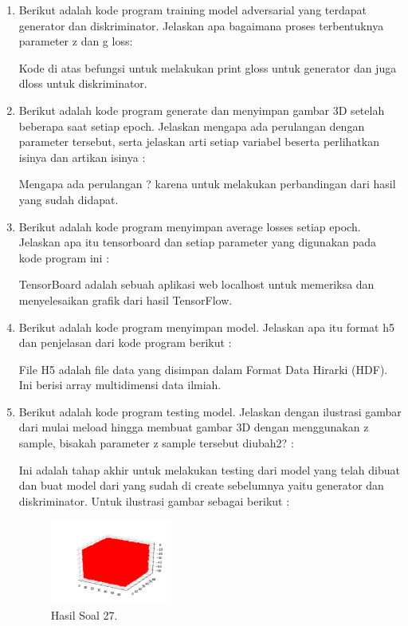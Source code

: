 \begin{enumerate}
    \item Berikut adalah kode program training model adversarial yang terdapat generator dan diskriminator. Jelaskan apa bagaimana proses terbentuknya parameter z dan g loss:
    
    \hfill\break
    Kode di atas befungsi untuk melakukan print gloss untuk generator dan juga dloss untuk diskriminator.

    \item  Berikut adalah kode program generate dan menyimpan gambar 3D setelah beberapa saat setiap epoch. Jelaskan mengapa ada perulangan dengan parameter tersebut, serta jelaskan arti setiap variabel beserta perlihatkan isinya dan artikan isinya :
    
    \hfill\break
    Mengapa ada perulangan ? karena untuk melakukan perbandingan dari hasil yang sudah didapat.

    \item Berikut adalah kode program menyimpan average losses setiap epoch. Jelaskan apa itu tensorboard dan setiap parameter yang digunakan pada kode program ini :
    
    \hfill\break
    TensorBoard adalah sebuah aplikasi web localhost untuk memeriksa dan menyelesaikan grafik dari hasil TensorFlow.
    
    \item Berikut adalah kode program menyimpan model. Jelaskan apa itu format h5 dan penjelasan dari kode program berikut :
    
    \hfill\break
    File H5 adalah file data yang disimpan dalam Format Data Hirarki (HDF). Ini berisi array multidimensi data ilmiah.

    \item Berikut adalah kode program testing model. Jelaskan dengan ilustrasi gambar dari mulai meload hingga membuat gambar 3D dengan menggunakan z sample, bisakah parameter z sample tersebut diubah2? :
    
    \hfill\break
    Ini adalah tahap akhir untuk melakukan testing dari model yang telah dibuat dan buat model dari yang sudah di create sebelumnya yaitu generator dan diskriminator. Untuk ilustrasi gambar sebagai berikut :
    \begin{figure}[H]
        \centering
            \includegraphics[width=4cm]{figures/1174096/tugas8/p27.PNG}
            \caption{Hasil Soal 27.}
        \end{figure}
\end{enumerate}

